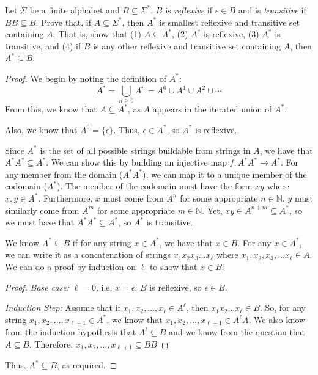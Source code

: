 \documentclass[11pt,fleqn]{article}
\newcommand{\set}[1]{{\{ #1 \}}}
\newcommand{\eps}{\epsilon}
\begin{document}
  \item Let $\Sigma$ be a finite alphabet and $B \subseteq \Sigma^*$.
    $B$ is \emph{reflexive} if $\epsilon \in B$ and is
    \emph{transitive} if $BB \subseteq B$.  Prove that, if $A
    \subseteq \Sigma^*$, then $A^*$ is smallest reflexive and
    transitive set containing $A$.  That is, show that (1) $A
    \subseteq A^*$, (2) $A^*$ is reflexive, (3) $A^*$ is transitive,
    and (4) if $B$ is any other reflexive and transitive set
    containing $A$, then $A^* \subseteq B$.
    \begin{proof}
    We begin by noting the definition of $A^*$: \[A^* = \bigcup_{n\geq0}A^n = A^0 \cup A^1 \cup A^2 \cup \cdots\] From this,  we know that $A \subseteq A^*$, as $A$ appears in the iterated union of $A^*$.

    Also, we know that $A^0 = \set\eps$. Thus, $\eps \in A^*$, so $A^*$ is reflexive.

    Since $A^*$ is the set of all possible strings buildable from strings in $A$, we have that $A^*A^* \subseteq A^*$. We can show this by building an injective map $f:A^*A^* \rightarrow A^*$. For any member from the domain ($A^*A^*$), we can map it to a unique member of the codomain ($A^*$). The member of the codomain must have the form $xy$ where $x,y\in A^*$. Furthermore, $x$ must come from $A^n$ for some appropriate $n \in \mathbb{N}$. $y$ must similarly come from $A^m$ for some appropriate $m \in \mathbb{N}$. Yet, $xy \in A^{n+m} \subseteq A^*$, so we must have that $A^*A^* \subseteq A^*$, so $A^*$ is transitive.

    We know $A^* \subseteq B$ if for any string $x \in A^*$, we have that $x \in B$. For any $x \in A^*$, we can write it as a concatenation of strings $x_1x_2x_3\ldots x_\ell$ where $x_1,x_2,x_3,\ldots x_\ell \in A$. We can do a proof by induction on $\ell$ to show that $x \in B$.
    \begin{proof}
    \emph{Base case:} $\ell = 0$. i.e. $x = \eps$. $B$ is reflexive, so $\eps \in B$.

    \emph{Induction Step:} Assume that if $x_1,x_2,\ldots,x_\ell \in A^\ell$, then $x_1x_2\ldots x_\ell \in B$.
    So, for any string $x_1,x_2,\ldots,x_{\ell+1} \in A^*$, we know that $x_1,x_2,\ldots,x_{\ell+1} \in A^\ell A $.
    We also know from the induction hypothesis that $A^\ell \subseteq B$ and we know from the question that $A \subseteq B$. Therefore, $x_1,x_2,\ldots,x_{\ell+1} \subseteq BB $
    \end{proof}
    Thus, $A^* \subseteq B$, as required.
    \end{proof}
\end{document}
